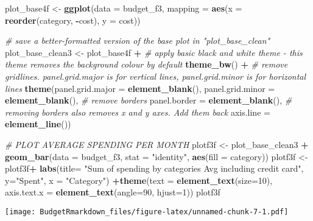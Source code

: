 \documentclass[
]{article}
\newenvironment{Shaded}{\begin{snugshade}}{\end{snugshade}}
\newcommand{\CommentTok}[1]{\textcolor[rgb]{0.56,0.35,0.01}{\textit{#1}}}
\newcommand{\DataTypeTok}[1]{\textcolor[rgb]{0.13,0.29,0.53}{#1}}
\newcommand{\DecValTok}[1]{\textcolor[rgb]{0.00,0.00,0.81}{#1}}
\newcommand{\KeywordTok}[1]{\textcolor[rgb]{0.13,0.29,0.53}{\textbf{#1}}}
\newcommand{\NormalTok}[1]{#1}
\newcommand{\OperatorTok}[1]{\textcolor[rgb]{0.81,0.36,0.00}{\textbf{#1}}}
\newcommand{\StringTok}[1]{\textcolor[rgb]{0.31,0.60,0.02}{#1}}
\begin{document}
\begin{Shaded}
\begin{Highlighting}[]
\NormalTok{plot_base4f <-}\StringTok{ }\KeywordTok{ggplot}\NormalTok{(}\DataTypeTok{data =}\NormalTok{ budget_f3, }\DataTypeTok{mapping =} \KeywordTok{aes}\NormalTok{(}\DataTypeTok{x =} \KeywordTok{reorder}\NormalTok{(category, }\OperatorTok{-}\NormalTok{cost), }\DataTypeTok{y =}\NormalTok{ cost))}

\CommentTok{# save a better-formatted version of the base plot in "plot_base_clean"}
\NormalTok{plot_base_clean3 <-}\StringTok{ }\NormalTok{plot_base4f }\OperatorTok{+}\StringTok{ }
\StringTok{  }\CommentTok{# apply basic black and white theme - this theme removes the background colour by default}
\StringTok{  }\KeywordTok{theme_bw}\NormalTok{() }\OperatorTok{+}\StringTok{ }
\StringTok{  }\CommentTok{# remove gridlines. panel.grid.major is for vertical lines, panel.grid.minor is for horizontal lines}
\StringTok{  }\KeywordTok{theme}\NormalTok{(}\DataTypeTok{panel.grid.major =} \KeywordTok{element_blank}\NormalTok{(), }\DataTypeTok{panel.grid.minor =} \KeywordTok{element_blank}\NormalTok{(),}
        \CommentTok{# remove borders}
        \DataTypeTok{panel.border =} \KeywordTok{element_blank}\NormalTok{(),}
        \CommentTok{# removing borders also removes x and y axes. Add them back}
        \DataTypeTok{axis.line =} \KeywordTok{element_line}\NormalTok{())}

\CommentTok{# PLOT AVERAGE SPENDING PER MONTH}
\NormalTok{plotf3f <-}\StringTok{ }\NormalTok{plot_base_clean3 }\OperatorTok{+}\StringTok{ }\KeywordTok{geom_bar}\NormalTok{(}\DataTypeTok{data =}\NormalTok{ budget_f3, }\DataTypeTok{stat =} \StringTok{"identity"}\NormalTok{, }\KeywordTok{aes}\NormalTok{(}\DataTypeTok{fill =}\NormalTok{ category))  }
\NormalTok{plotf3f <-}\StringTok{ }\NormalTok{plotf3f}\OperatorTok{+}\StringTok{ }\KeywordTok{labs}\NormalTok{(}\DataTypeTok{title=} \StringTok{"Sum of spending by categories Avg including credit card"}\NormalTok{, }\DataTypeTok{y=}\StringTok{"Spent"}\NormalTok{, }\DataTypeTok{x =} \StringTok{"Category"}\NormalTok{) }\OperatorTok{+}\KeywordTok{theme}\NormalTok{(}\DataTypeTok{text =} \KeywordTok{element_text}\NormalTok{(}\DataTypeTok{size=}\DecValTok{10}\NormalTok{), }\DataTypeTok{axis.text.x =} \KeywordTok{element_text}\NormalTok{(}\DataTypeTok{angle=}\DecValTok{90}\NormalTok{, }\DataTypeTok{hjust=}\DecValTok{1}\NormalTok{)) }
\NormalTok{plotf3f}
\end{Highlighting}
\end{Shaded}

\texttt{[image: BudgetRmarkdown\_files/figure-latex/unnamed-chunk-7-1.pdf]}
\end{document}
